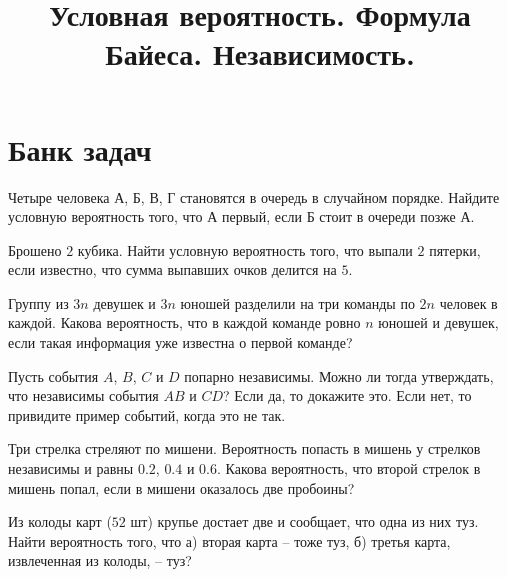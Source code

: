 

\title{Условная вероятность. Формула Байеса. Независимость.} 
\date{\vspace{-1cm}}


\maketitle

\section*{Банк задач}
\begin{problem}
    Четыре человека А, Б, В, Г становятся в очередь в случайном порядке.
    Найдите условную вероятность того, что А первый, если Б стоит в очереди позже А.
\end{problem}

\begin{problem}
    Брошено $2$ кубика.
    Найти условную вероятность того, что выпали $2$ пятерки, если известно, что сумма выпавших очков делится на $5$.
\end{problem}

\begin{problem}
    Группу из $3 n$ девушек и $3 n$ юношей разделили на три команды по $2 n$ человек в каждой.
    Какова вероятность, что в каждой команде ровно $n$ юношей и девушек, если такая информация уже известна о первой команде?
\end{problem}

\begin{problem}
    Пусть события $A$, $B$, $C$ и $D$ попарно независимы.
    Можно ли тогда утверждать, что независимы события $AB$ и $CD$?
    Если да, то докажите это.
    Если нет, то привидите пример событий, когда это не так.
\end{problem}

\begin{problem}
    Три стрелка стреляют по мишени.
    Вероятность попасть в мишень у стрелков независимы и равны $0.2$, $0.4$ и $0.6$.
    Какова вероятность, что второй стрелок в мишень попал, если в мишени оказалось две пробоины?
\end{problem}

\begin{problem}
    Из колоды карт ($52$ шт) крупье достает две и сообщает, что одна из них туз.
    Найти вероятность того, что а) вторая карта -- тоже туз, б) третья карта, извлеченная из колоды, -- туз?
\end{problem}

